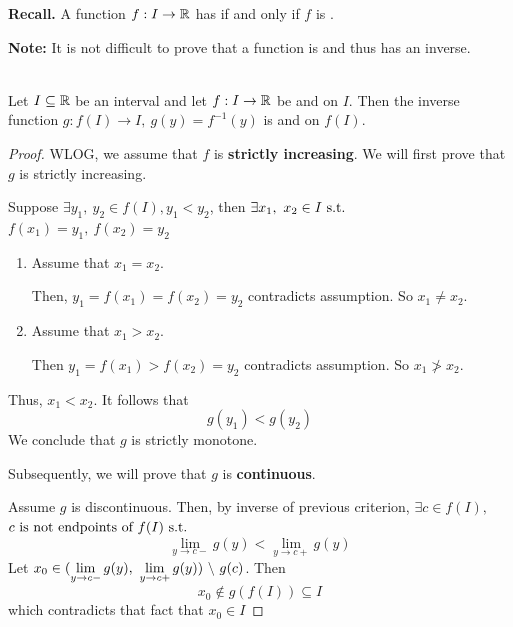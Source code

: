 \documentclass[a4paper,12pt]{article}
\begin{document}
\newpage

\textbf{Recall. } A function \(f:I\rightarrow\mathbb{R}\) has  if and only if \(f\) is . 

\textbf{Note:} It is not difficult to prove that a  function is  and thus has an inverse.\\

\begin{theorem}\ \\
    Let \(I\subseteq\mathbb{R}\) be an interval and let \(f:I\rightarrow\mathbb{R}\) be  and  on \(I\).
    Then the inverse function \(g:f(I)\rightarrow I,\ g(y)=f^{-1}(y)\) is  and  on \(f(I)\).

    \begin{proof}
        WLOG, we assume that \(f\) is \textbf{strictly increasing}. We will first prove that \(g\) is strictly increasing.

        Suppose \(\exists y_1,\ y_2\in f(I), y_1<y_2\), then \(\exists x_1,\ x_2\in I\text{ s.t. }\)
        \(f(x_1)=y_1,\ f(x_2)=y_2\)
        \begin{enumerate}
            \item Assume that \(x_1=x_2\). 
            
            Then, \(y_1=f(x_1)=f(x_2)=y_2\) contradicts assumption. So \(x_1\neq x_2\).
            \item Assume that \(x_1>x_2\). 
            
            Then \(y_1=f(x_1)>f(x_2)=y_2\) contradicts assumption. So \(x_1\not>x_2\).
        \end{enumerate}
        Thus, \(x_1<x_2\). It follows that \[g(y_1)<g(y_2)\]
        We conclude that \(g\) is strictly monotone.

        Subsequently, we will prove that \(g\) is \textbf{continuous}.

        Assume \(g\) is discontinuous. Then, by inverse of previous criterion, \(\exists c\in f(I),\ \) \\\(c\text{ is not endpoints of } f(I)\text{ s.t. }\)
        \[\lim_{y\rightarrow c-}{g(y)}<\lim_{y\rightarrow c+}{g(y)}\]
        Let \(x_0\in(\ds\lim_{y\rightarrow c-}{g(y)},\ \lim_{y\rightarrow c+}{g(y)})\ \backslash\ g(c)\).
        Then \[x_0\not\in g(f(I))\subseteq I\]
        which contradicts that fact that \(x_0\in I \)
    \end{proof}
\end{theorem}
\end{document}
